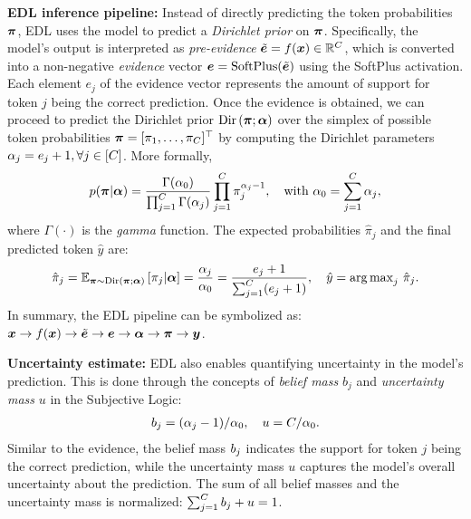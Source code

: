 
\textbf{EDL inference pipeline:} Instead of directly predicting the token probabilities $\bm{\pi}$, EDL uses the model to predict a \emph{Dirichlet prior} on $\bm{\pi}$. Specifically, the model's output is interpreted as \emph{pre-evidence} $\tilde{\bm{e}} = f(\bm{x}) \in \mathbb{R}^C$, which is converted into a non-negative \emph{evidence} vector $\bm{e} = \text{SoftPlus}(\tilde{\bm{e}})$ using the SoftPlus activation. Each element $e_j$ of the evidence vector represents the amount of support for token $j$ being the correct prediction. Once the evidence is obtained, we can proceed to predict the Dirichlet prior $\text{Dir}\left( \bm{\pi}; \bm{\alpha} \right)$ over the simplex of possible token probabilities $\bm{\pi} = [\pi_1, \ldots, \pi_C]^\top$ by computing the Dirichlet parameters $\alpha_j = e_j + 1, \forall j \in [C]$. More formally,
\begin{equation}
    \begin{aligned}
        p(\bm{\pi} | \bm{\alpha}) = \frac{\Gamma(\alpha_0)}{\prod_{j=1}^C \Gamma(\alpha_j)} \prod_{j=1}^C \pi_j^{\alpha_j - 1}, \quad \text{with }\alpha_0 = \sum_{j=1}^C \alpha_j,
    \end{aligned}
\end{equation}
where $\Gamma(\cdot)$ is the \emph{gamma} function. 
The expected probabilities $\hat{\pi}_j$ and the final predicted token $\hat{y}$ are: 
\begin{equation}
    \begin{aligned}
        \hat{\pi}_j = \mathbb{E}_{\bm{\pi} \sim \text{Dir}\left( \bm{\pi} ; \bm{\alpha} \right)} \left[\pi_j | \bm{\alpha} \right] = \frac{\alpha_j}{\alpha_0} = \frac{e_j + 1}{\sum_{j=1}^C (e_j + 1)}, \quad \hat{y} = {\arg \max}_{j} \  \hat{\pi}_j.
    \end{aligned}
\end{equation}
In summary, the EDL pipeline can be symbolized as: $\bm{x} \rightarrow f(\bm{x}) \rightarrow \tilde{\bm{e}} \rightarrow \bm{e} \rightarrow \bm{\alpha} \rightarrow \bm{\pi} \rightarrow \bm{y}$.

\textbf{Uncertainty estimate:} EDL also enables quantifying uncertainty in the model's prediction. This is done through the concepts of \emph{belief mass} $b_j$ and \emph{uncertainty mass} $u$ in the Subjective Logic:
\begin{equation}
    \begin{aligned}
        b_j = (\alpha_j - 1) / \alpha_0, \quad u = C / \alpha_0.
    \end{aligned}
\end{equation}
Similar to the evidence, the belief mass $b_j$ indicates the support for token $j$ being the correct prediction, while the uncertainty mass $u$ captures the model's overall uncertainty about the prediction. The sum of all belief masses and the uncertainty mass is normalized: $\sum_{j=1}^C b_j + u = 1$.


